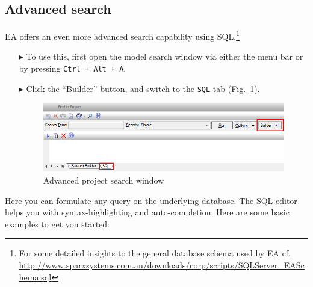\subsection{Advanced search}
\label{sect:appendix_adv_search}

EA offers an even more advanced search capability using SQL.\footnote{For some detailed insights to the general database schema used by EA cf. \\
\url{http://www.sparxsystems.com.au/downloads/corp/scripts/SQLServer_EASchema.sql}}

\begin{itemize}

\item[$\blacktriangleright$] To use this, first open the model search window via either the menu bar or by pressing \texttt{Ctrl + Alt + A}.

\item[$\blacktriangleright$] Click the ``Builder'' button, and switch to the \texttt{SQL} tab (Fig.~\ref{ea:builderSQLtab}). 

\begin{figure}[htbp]
\begin{center}
  \includegraphics[width=\textwidth]{ea_activateSQLSearch}
  \caption{Advanced project search window}  
  \label{ea:builderSQLtab}
\end{center}
\end{figure}

\end{itemize}

Here you can formulate any query on the underlying database. The SQL-editor helps you with syntax-highlighting and auto-completion. Here are some basic
examples to get you started:

